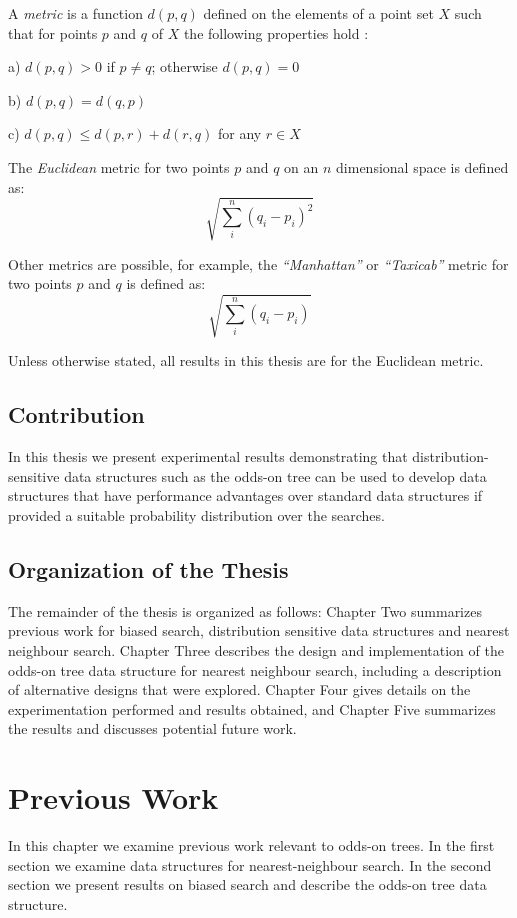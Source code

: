 \documentclass[mcs]{scsthesis}
\begin{document}
A \emph{metric} is a function \(d(p,q)\) defined on the elements of a point set
\(X\) such that for points \(p\) and \(q\) of \(X\) the following properties
hold \cite{rudin}:

a) \(d(p,q) > 0\) if \(p \ne q\); otherwise \(d(p, q) = 0\)

b) \(d(p,q) = d(q, p)\)

c) \(d(p,q) \le d(p, r) + d(r, q)\) for any \(r \in X\) 

The \emph{Euclidean} metric for two points \(p\) and \(q\) on an \(n\)
dimensional space is defined as:
$$
\sqrt{\sum_i^n{(q_i-p_i)^2}}
$$

Other metrics are possible, for example, the \emph{``Manhattan''} or
\emph{``Taxicab''} metric for two points \(p\) and \(q\) is defined as:
$$
\sqrt{\sum_i^n{(q_i-p_i)}}
$$

Unless otherwise stated, all results in this thesis are for the Euclidean
metric.

\section{Contribution}

In this thesis we present experimental results demonstrating that
distribution-sensitive data structures such as the odds-on tree can be used to
develop data structures that have performance advantages over standard data
structures if provided a suitable probability distribution over the searches.

\section{Organization of the Thesis}

The remainder of the thesis is organized as follows: Chapter Two summarizes
previous work for biased search, distribution sensitive data structures and
nearest neighbour search.  Chapter Three describes the design and implementation
of the odds-on tree data structure for nearest neighbour search, including a
description of alternative designs that were explored. Chapter Four gives
details on the experimentation performed and results obtained, and Chapter Five
summarizes the results and discusses potential future work.

\chapter{Previous Work}

In this chapter we examine previous work relevant to odds-on trees. In the first
section we examine data structures for nearest-neighbour search. In the second
section we present results on biased search and describe the odds-on tree data
structure.
\end{document}
